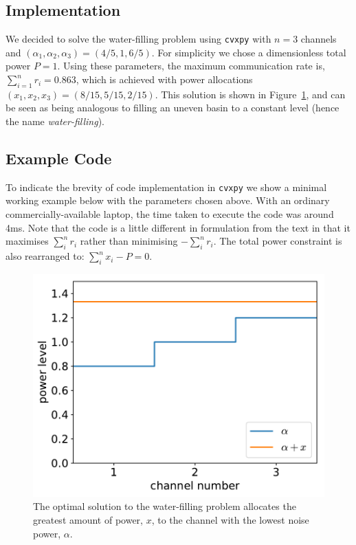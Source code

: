 \documentclass[twocolumn,secnumarabic,amssymb, nobibnotes, aps, prl,superscriptaddress]{revtex4-1}
\begin{document}
\subsection{Implementation}
\noindent We decided to solve the water-filling problem using \texttt{cvxpy} with $n=3$ channels and $(\alpha_1,\alpha_2,\alpha_3) = (4/5,1,6/5)$.  For simplicity we chose a dimensionless total power $P=1$.  Using these parameters, the maximum communication rate is, $\sum_{i=1}^{n}r_i = 0.863$, which is achieved with power allocations $(x_1,x_2,x_3) = (8/15,5/15,2/15)$.  This solution is shown in Figure~\ref{fig:waterfilling}, and can be seen as being analogous to filling an uneven basin to a constant level (hence the name \textit{water-filling}).

\subsection{Example Code}
\noindent To indicate the brevity of code implementation in \texttt{cvxpy} we show a minimal working example below with the parameters chosen above.  With an ordinary commercially-available laptop, the time taken to execute the code was around 4ms. Note that the code is a little different in formulation from the text in that it maximises $\sum_{i}^nr_i$ rather than minimising $-\sum_{i}^{n}r_i$. The total power constraint is also rearranged to: $\sum_i^nx_i - P = 0$.


\begin{figure}[H]
\centering
\includegraphics[width=1.0\linewidth]{water_filling_plot.pdf}
\caption{The optimal solution to the water-filling problem allocates the greatest amount of power, $x$, to the channel with the lowest noise power, $\alpha$.}
\label{fig:waterfilling}
\end{figure}
\end{document}
